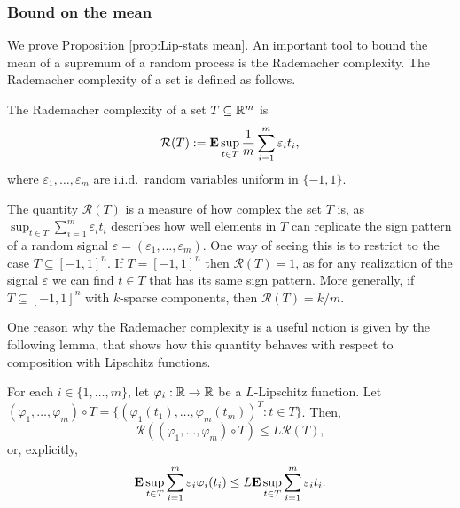 \subsubsection{Bound on the mean}
\label{sec:Bound on the mean}
We prove Proposition \ref{prop:Lip-stats mean}. An important tool to bound the mean of a supremum of a random process is the Rademacher complexity.
The Rademacher complexity of a set is defined as follows.
\begin{definition}
\label{def:Rademacher}
The Rademacher complexity of a set $T\subseteq\mathbb{R}^m$ is
$$
	\mathcal{R}(T) := \E \sup_{t\in T} \frac{1}{m} \sum_{i=1}^m \varepsilon_i t_i,
$$
where $\varepsilon_1,\ldots,\varepsilon_m$ are i.i.d.\ random variables uniform in $\{-1,1\}$.
\end{definition}

The quantity $\mathcal{R}(T)$ is a measure of how complex the set $T$ is, as $\sup_{t\in T} \sum_{i=1}^m \varepsilon_i t_i$ describes how well elements in $T$ can replicate the sign pattern of a random signal $\varepsilon=(\varepsilon_1,\ldots,\varepsilon_m)$. One way of seeing this is to restrict to the case $T\subseteq [-1,1]^n$. If $T= [-1,1]^n$ then $\mathcal{R}(T)=1$, as for any realization of the signal $\varepsilon$ we can find $t\in T$ that has its same sign pattern. More generally, if $T\subseteq[-1,1]^n$ with $k$-sparse components, then $\mathcal{R}(T)=k/m$. 

One reason why the Rademacher complexity is a useful notion is given by the following lemma, that shows how this quantity behaves with respect to composition with Lipschitz functions.

\begin{lemma}
\label{lem:contraction}
For each $i\in\{1,\ldots,m\}$, let $\varphi_i:\mathbb{R}\rightarrow\mathbb{R}$ be a $L$-Lipschitz function. Let $(\varphi_1,\ldots,\varphi_m) \circ T=\{ (\varphi_1(t_1),\ldots,\varphi_m(t_m))^T : t\in T \}$. Then,
$$
	\mathcal{R}((\varphi_1,\ldots,\varphi_m) \circ T)
	\le 
	L 
	\mathcal{R}(T),
$$
or, explicitly,
$$
	\E\sup_{t\in T}\sum_{i=1}^m \varepsilon_i \varphi_i(t_i)
	\le
	L \E\sup_{t\in T}\sum_{i=1}^m \varepsilon_i t_i. 
$$
\end{lemma}

